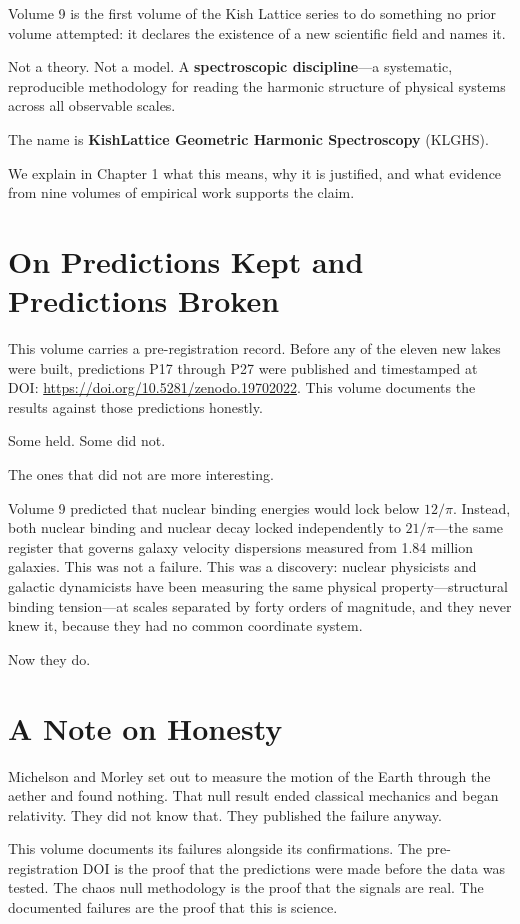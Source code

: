 \documentclass[11pt, letterpaper, openany]{book}
\begin{document}
Volume 9 is the first volume of the Kish Lattice series to do something no prior
volume attempted: it declares the existence of a new scientific field and names it.

Not a theory. Not a model. A \textbf{spectroscopic discipline}---a systematic,
reproducible methodology for reading the harmonic structure of physical systems
across all observable scales.

The name is \textbf{KishLattice Geometric Harmonic Spectroscopy} (KLGHS).

We explain in Chapter 1 what this means, why it is justified, and what evidence
from nine volumes of empirical work supports the claim.

\section*{On Predictions Kept and Predictions Broken}

This volume carries a pre-registration record. Before any of the eleven new lakes
were built, predictions P17 through P27 were published and timestamped at
DOI: \url{https://doi.org/10.5281/zenodo.19702022}. This volume documents the results against
those predictions honestly.

Some held. Some did not.

The ones that did not are more interesting.

Volume 9 predicted that nuclear binding energies would lock below $12/\pi$. Instead,
both nuclear binding and nuclear decay locked independently to $21/\pi$---the same
register that governs galaxy velocity dispersions measured from 1.84 million
galaxies. This was not a failure. This was a discovery: nuclear physicists and
galactic dynamicists have been measuring the same physical property---structural
binding tension---at scales separated by forty orders of magnitude, and they never
knew it, because they had no common coordinate system.

Now they do.

\section*{A Note on Honesty}

Michelson and Morley set out to measure the motion of the Earth through the aether
and found nothing. That null result ended classical mechanics and began relativity.
They did not know that. They published the failure anyway.

This volume documents its failures alongside its confirmations. The
pre-registration DOI is the proof that the predictions were made before the
data was tested. The chaos null methodology is the proof that the signals are
real. The documented failures are the proof that this is science.
\end{document}
